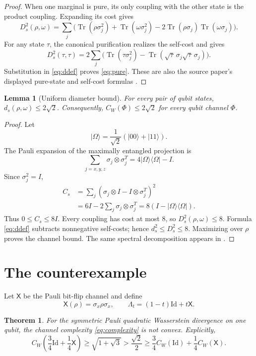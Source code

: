 \documentclass[11pt]{article}
\newtheorem{theorem}{Theorem}
\newtheorem{lemma}{Lemma}
\theoremstyle{remark}
\newcommand{\id}{\mathrm{Id}}
\newcommand{\tr}{\operatorname{Tr}}
\begin{document}
\begin{proof}
When one marginal is pure, its only coupling with the other state is the
product coupling.  Expanding its cost gives
\[
 D_s^2(\rho,\omega)=\sum_j
 \bigl(\tr(\rho\sigma_j^2)+\tr(\omega\sigma_j^2)
 -2\tr(\rho\sigma_j)\tr(\omega\sigma_j)\bigr).
\]
For any state $\tau$, the canonical purification realizes the self-cost and
gives
\[
 D_s^2(\tau,\tau)=2\sum_j
 \bigl(\tr(\tau\sigma_j^2)
 -\tr(\sqrt\tau\,\sigma_j\sqrt\tau\,\sigma_j)\bigr).
\]
Substitution in \eqref{eq:ddef} proves \eqref{eq:pure}.  These are also the
source paper's displayed pure-state and self-cost formulas
\cite[Sec.~2]{BPVT}.
\end{proof}

\begin{lemma}[Uniform diameter bound]\label{lem:diameter}
For every pair of qubit states, $d_s(\rho,\omega)\leq2\sqrt2$.  Consequently,
$C_W(\Phi)\leq2\sqrt2$ for every qubit channel $\Phi$.
\end{lemma}

\begin{proof}
Let
\[
 |\Omega\rangle=\frac1{\sqrt2}(|00\rangle+|11\rangle).
\]
The Pauli expansion of the maximally entangled projection is
\[
 \sum_{j=x,y,z}\sigma_j\otimes\sigma_j^T
 =4|\Omega\rangle\langle\Omega|-I.
\]
Since $\sigma_j^2=I$,
\begin{align*}
 C_s&=\sum_j(\sigma_j\otimes I-I\otimes\sigma_j^T)^2\\
 &=6I-2\sum_j\sigma_j\otimes\sigma_j^T
 =8(I-|\Omega\rangle\langle\Omega|).
\end{align*}
Thus $0\leq C_s\leq8I$.  Every coupling has cost at most $8$, so
$D_s^2(\rho,\omega)\leq8$.  Formula \eqref{eq:ddef} subtracts nonnegative
self-costs; hence $d_s^2\leq D_s^2\leq8$.  Maximizing over $\rho$ proves the
channel bound.  The same spectral decomposition appears in
\cite[Eq.~(24)]{BPVT}.
\end{proof}

\section{The counterexample}

Let $\mathsf X$ be the Pauli bit-flip channel and define
\begin{equation}\label{eq:channel}
 \mathsf X(\rho)=\sigma_x\rho\sigma_x,
 \qquad
 \Lambda_t=(1-t)\id+t\mathsf X.
\end{equation}

\begin{theorem}\label{thm:counterexample}
For the symmetric Pauli quadratic Wasserstein divergence on one qubit, the
channel complexity \eqref{eq:complexity} is not convex.  Explicitly,
\[
 C_W\!\left(\frac34\id+\frac14\mathsf X\right)
 \geq\sqrt{1+\sqrt3}
 >\frac{\sqrt2}{2}
 \geq\frac34C_W(\id)+\frac14C_W(\mathsf X).
\]
\end{theorem}
\end{document}
